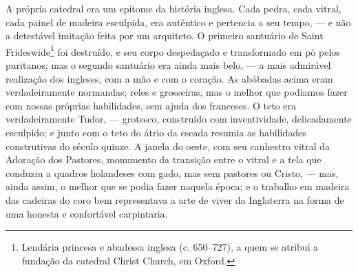 A própria catedral era um epítome da história inglesa. Cada pedra, cada
vitral, cada painel de madeira esculpida, era autêntico e pertencia a
seu tempo, --- e não a detestável imitação feita por um arquiteto. O
primeiro santuário de Saint Frideswide\footnote{Lendária princesa e
  abadessa inglesa (c. 650--727), a quem se atribui a fundação da catedral
  Christ Church, em Oxford.} foi destruído, e seu corpo
despedaçado e transformado em pó pelos puritanos; mas o segundo
santuário era ainda mais belo, --- a mais admirável realização dos
ingleses, com a mão e com o coração. As abóbadas acima eram
verdadeiramente normandas; reles e grosseiras, mas o melhor que podíamos
fazer com nossas próprias habilidades, sem ajuda dos franceses. O teto
era verdadeiramente Tudor, --- grotesco, construído com inventividade,
delicadamente esculpido; e junto com o teto do átrio da escada resumia
as habilidades construtivas do século quinze. A janela do oeste, com seu
canhestro vitral da Adoração dos Pastores, monumento da transição entre
o vitral e a tela que conduziu a quadros holandeses com gado, mas sem
pastores ou Cristo, --- mas, ainda assim, o melhor que se podia fazer
naquela época; e o trabalho em madeira das cadeiras do coro bem
representava a arte de viver da Inglaterra na forma de uma honesta e
confortável carpintaria.


